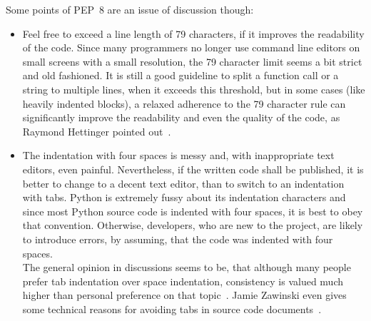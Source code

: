 		Some points of PEP~8 are an issue of discussion though:
		\begin{itemize}
			\item Feel free to exceed a line length of 79 characters, if it improves the readability of the code.
			      Since many programmers no longer use command line editors on small screens with a small resolution, the 79 character limit seems a bit strict and old fashioned.
			      It is still a good guideline to split a function call or a string to multiple lines, when it exceeds this threshold, but in some cases (like heavily indented blocks), a relaxed adherence to the 79 character rule can significantly improve the readability and even the quality of the code, as Raymond Hettinger pointed out~\cite{HettingerPEP8}.
			\item The indentation with four spaces is messy and, with inappropriate text editors, even painful.
			      Nevertheless, if the written code shall be published, it is better to change to a decent text editor, than to switch to an indentation with tabs.
			      Python is extremely fussy about its indentation characters and since most Python source code is indented with four spaces, it is best to obey that convention.
			      Otherwise, developers, who are new to the project, are likely to introduce errors, by assuming, that the code was indented with four spaces.\\
			      The general opinion in discussions seems to be, that although many people prefer tab indentation over space indentation, consistency is valued much higher than personal preference on that topic~\cite{TabsVsSpaces}.
			      Jamie Zawinski even gives some technical reasons for avoiding tabs in source code documents~\cite{Zawinski}.
		\end{itemize}

